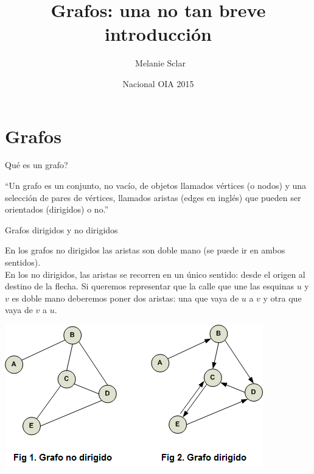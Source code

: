 \documentclass[compress]{beamer}
\title[Grafos: una no tan breve introducción] %
{Grafos: una no tan breve introducción}
\author[Melanie Sclar] %
{~Melanie Sclar}
\institute[UBA] %
{
  Facultad de Ciencias Exactas y Naturales\\
  Universidad de Buenos Aires
}
\date[Nacional OIA 2015] %
{Nacional OIA 2015}
\begin{document}
\begin{frame}
  \titlepage
\end{frame}

\section{Grafos}
\begin{frame}{\textquestiondown Qué es un grafo?}
\begin{exampleblock}{}
  {\large ``Un grafo es un conjunto, no vacío, de objetos llamados vértices (o nodos) y una selección de pares de vértices, llamados aristas (edges en inglés) que pueden ser orientados (dirigidos) o no.''}
  \vskip5mm
  \hspace*{}
\end{exampleblock}
  \pause
{}
\end{frame}

\begin{frame}{Grafos dirigidos y no dirigidos}

{\small

En los grafos no dirigidos las aristas son doble mano (se puede ir en ambos sentidos). \\
En los no dirigidos, las aristas se recorren en un único sentido: desde el origen al destino de la flecha. Si queremos representar que la calle que une las esquinas $u$ y $v$ es doble mano deberemos poner dos aristas: una que vaya de $u$ a $v$ y otra que vaya de $v$ a $u$.}

\begin{center}
\includegraphics[scale=0.75]{grafos-dirigidos-y-no-dirigidos.png}
\end{center}
\end{frame}
\end{document}
